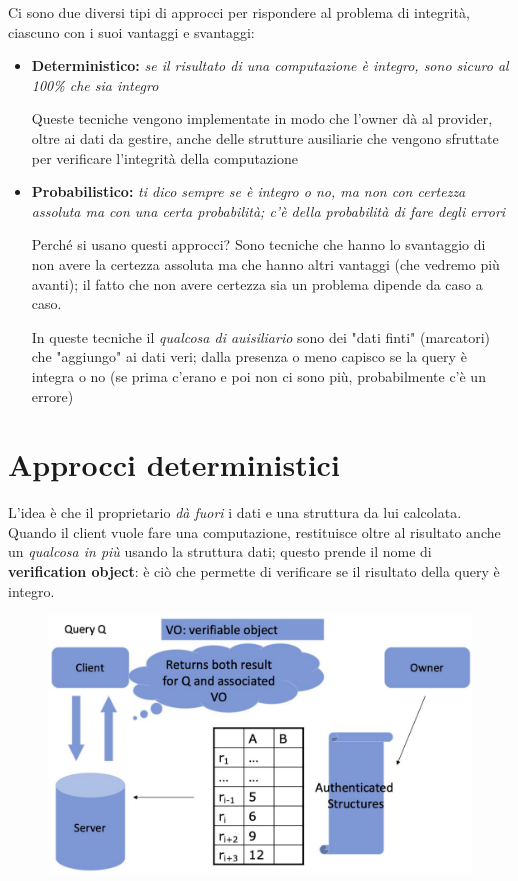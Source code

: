 \documentclass{report}
\begin{document}
\noindent Ci sono due diversi tipi di approcci per rispondere al problema di integrità, 
ciascuno con i suoi vantaggi e svantaggi:
\begin{itemize}
    \item \textbf{Deterministico:} \textit{se il risultato di una computazione è integro, sono sicuro 
    al 100\% che sia integro}

    \noindent Queste tecniche vengono implementate in modo che l'owner dà al provider, oltre ai 
    dati da gestire, anche delle strutture ausiliarie che vengono sfruttate per verificare l'integrità della computazione 
    \item \textbf{Probabilistico:} \textit{ti dico sempre se è integro o no, ma non con certezza 
    assoluta ma con una certa probabilità; c'è della probabilità di fare degli errori}

    \noindent Perché si usano questi approcci? Sono tecniche che hanno lo svantaggio di non 
    avere la certezza assoluta ma che hanno altri vantaggi (che vedremo più avanti); il fatto 
    che non avere certezza sia un problema dipende da caso a caso.

    \noindent In queste tecniche il \textit{qualcosa di auisiliario} sono dei "dati finti" (marcatori)
    che "aggiungo" ai dati veri; dalla presenza o meno capisco se la query è integra o no (se prima c'erano e poi 
    non ci sono più, probabilmente c'è un errore)
\end{itemize}

\chapter{Approcci deterministici}

L'idea è che il proprietario \textit{dà fuori} i dati e una struttura 
da lui calcolata. Quando il client vuole fare una computazione, restituisce 
oltre al risultato anche un \textit{qualcosa in più} usando la struttura 
dati; questo prende il nome di 
\textbf{verification object}: è ciò che permette di verificare se il risultato della 
query è integro. 

\begin{figure}[H]
    \centering
    \includegraphics[width=0.8\linewidth]{images/det-idea.png}
\end{figure}
\end{document}
